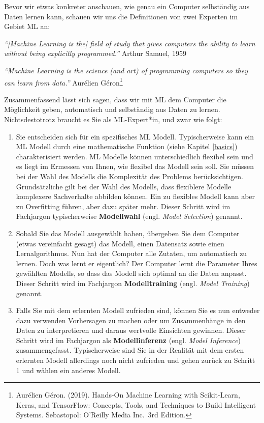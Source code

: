 \documentclass[
]{book}
\providecommand{\tightlist}{%
  \setlength{\itemsep}{0pt}\setlength{\parskip}{0pt}}
\begin{document}
Bevor wir etwas konkreter anschauen, wie genau ein Computer selbständig aus Daten lernen kann, schauen wir uns die Definitionen von zwei Experten im Gebiet ML an:

\emph{``{[}Machine Learning is the{]} field of study that gives computers the ability to learn without being explicitly programmed.''} Arthur Samuel, 1959

\emph{``Machine Learning is the science (and art) of programming computers so they can learn from data.''} Aurélien Géron\footnote{Aurélien Géron. (2019). Hands-On Machine Learning with Scikit-Learn, Keras, and TensorFlow: Concepts, Tools, and Techniques to Build Intelligent Systems. Sebastopol: O'Reilly Media Inc.~3rd Edition.}

Zusammenfassend lässt sich sagen, dass wir mit ML dem Computer die Möglichkeit geben, automatisch und selbständig aus Daten zu lernen. Nichtsdestotrotz braucht es Sie als ML-Expert*in, und zwar wie folgt:

\begin{enumerate}
\def\labelenumi{\arabic{enumi}.}
\tightlist
\item
  Sie entscheiden sich für ein spezifisches ML Modell. Typischerweise kann ein ML Modell durch eine mathematische Funktion (siehe Kapitel \ref{basics}) charakterisiert werden. ML Modelle können unterschiedlich flexibel sein und es liegt im Ermessen von Ihnen, wie flexibel das Modell sein soll. Sie müssen bei der Wahl des Modells die Komplexität des Problems berücksichtigen. Grundsätzliche gilt bei der Wahl des Modells, dass flexiblere Modelle komplexere Sachverhalte abbilden können. Ein zu flexibles Modell kann aber zu Overfitting führen, aber dazu später mehr. Dieser Schritt wird im Fachjargon typischerweise \textbf{Modellwahl} (engl. \emph{Model Selection}) genannt.
\item
  Sobald Sie das Modell ausgewählt haben, übergeben Sie dem Computer (etwas vereinfacht gesagt) das Modell, einen Datensatz sowie einen Lernalgorithmus. Nun hat der Computer alle Zutaten, um automatisch zu lernen. Doch was lernt er eigentlich? Der Computer lernt die Parameter Ihres gewählten Modells, so dass das Modell sich optimal an die Daten anpasst. Dieser Schritt wird im Fachjargon \textbf{Modelltraining} (engl. \emph{Model Training}) genannt.
\item
  Falls Sie mit dem erlernten Modell zufrieden sind, können Sie es nun entweder dazu verwenden Vorhersagen zu machen oder um Zusammenhänge in den Daten zu interpretieren und daraus wertvolle Einsichten gewinnen. Dieser Schritt wird im Fachjargon als \textbf{Modellinferenz} (engl. \emph{Model Inference}) zusammengefasst. Typischerweise sind Sie in der Realität mit dem ersten erlernten Modell allerdings noch nicht zufrieden und gehen zurück zu Schritt 1 und wählen ein anderes Modell.
\end{enumerate}
\end{document}
